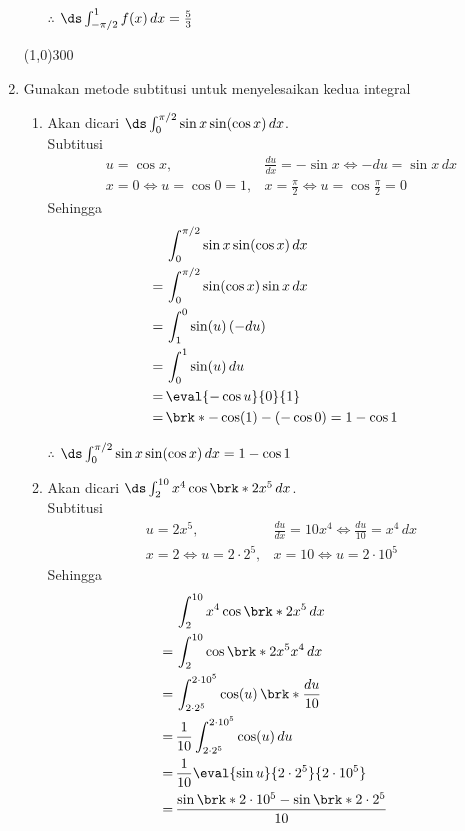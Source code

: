 \begin{enumerate}[leftmargin=*, label={\arabic*}.]
\begin{enumerate}[label={\alph*}.]
    $\therefore$ $\ds \int_{-\pi/2}^{1}f(x)\,dx =\frac{5}{3}$
\end{enumerate}
\begin{center}
    \line(1,0){300}
\end{center}
\item Gunakan metode subtitusi untuk menyelesaikan kedua integral
\begin{enumerate}[label={\alph*}.]
    \item Akan dicari $\ds \int_{0}^{\pi/2} \sin x\sin(\cos x)\,dx$.\\
    Subtitusi
    \begin{align*}
        &u = \cos x,&\frac{du}{dx} = -\sin x \iff -du = \sin x\,dx\\
        &x=0 \iff u = \cos 0 = 1,&x=\frac{\pi}{2} \iff u = \cos \frac{\pi}{2} = 0
    \end{align*}
    Sehingga 
    \begin{align*}
        &\int_{0}^{\pi/2} \sin x\sin(\cos x)\,dx\\
        =\,& \int_{0}^{\pi/2} \sin(\cos x)\sin x\,dx\\
        =\,& \int_{1}^{0} \sin(u)\,(-du)\\
        =\,& \int_{0}^{1} \sin(u)\,du\\
        =\,& \eval{-\cos u}{0}{1}\\
        =\,& \brk*{-\cos(1)-(-\cos 0)} = 1-\cos 1
    \end{align*}
    
    $\therefore$ $\ds \int_{0}^{\pi/2} \sin x\sin(\cos x)\,dx = 1-\cos 1$
    
    \item Akan dicari $\ds \int_{2}^{10} x^{4}\cos\brk*{2x^{5}}\,dx$.\\
    Subtitusi
    \begin{align*}
        &u = 2x^{5},&\frac{du}{dx} = 10x^{4} \iff \frac{du}{10} = x^{4}\,dx\\
        &x=2 \iff u = 2\cdot2^{5},&x=10 \iff u = 2\cdot10^{5}
    \end{align*}
    Sehingga 
    \begin{align*}
        &\int_{2}^{10} x^{4}\cos\brk*{2x^{5}}\,dx\\
        =\,& \int_{2}^{10} \cos\brk*{2x^{5}}x^{4}\,dx\\
        =\,& \int_{2\cdot2^{5}}^{2\cdot10^{5}} \cos(u)\,\brk*{\frac{du}{10}}\\
        =\,& \frac{1}{10}\int_{2\cdot2^{5}}^{2\cdot10^{5}} \cos(u)\,du\\
        =\,& \frac{1}{10}\eval{\sin u}{2\cdot2^{5}}{2\cdot10^{5}}\\
        =\,& \frac{\sin \brk*{2\cdot10^{5}}-\sin \brk*{2\cdot2^{5}}}{10}
    \end{align*}


\end{enumerate}
\end{enumerate}
